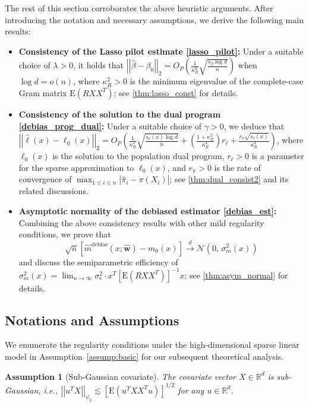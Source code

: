 \documentclass[ejsv2,noshowframe]{imsart}
\theoremstyle{plain}
\newtheorem{assumption}{Assumption}
\theoremstyle{definition}
\theoremstyle{remark}
\newcommand{\norm}[1]{\left|\left| #1 \right|\right|}
\renewcommand{\hat}{\widehat}
\begin{document}
The rest of this section corroborates the above heuristic arguments. After introducing the notation and necessary assumptions, we derive the following main results:
\begin{itemize}
	\item {\bf Consistency of the Lasso pilot estimate \eqref{lasso_pilot}:} Under a suitable choice of $\lambda > 0$, it holds that $\norm{\hat{\beta}-\beta_0}_2= O_P\left(\frac{1}{\kappa_R^2}\sqrt{\frac{s_{\beta}\log d}{n}}\right)$ when $\log d=o(n)$, where $\kappa_R^2 >0$ is the minimum eigenvalue of the complete-case Gram matrix $\mathrm{E}\left(RXX^T\right)$; see \autoref{thm:lasso_const} for details.
	
	\item {\bf Consistency of the solution to the dual program \eqref{debias_prog_dual}:} Under a suitable choice of $\gamma >0$, we deduce that $\norm{\hat{\ell}(x) -\ell_0(x)}_2 = O_P\left(\frac{1}{\kappa_R^3} \sqrt{\frac{s_{\ell}(x)\log d}{n}} + \left(\frac{1+\kappa_R^2}{\kappa_R^4}\right) r_{\ell} + \frac{r_{\pi}\sqrt{s_{\ell}(x)}}{\kappa_R^4} \right)$, where $\ell_0(x)$ is the solution to the population dual program, $r_{\ell}>0$ is a parameter for the sparse approximation to $\ell_0(x)$, and $r_{\pi}>0$ is the rate of convergence of $\max_{1 \leq i \leq n}\left|\hat{\pi}_i-\pi(X_i) \right|$; see \autoref{thm:dual_consist2} and its related discussions.
	
	\item {\bf Asymptotic normality of the debiased estimator \eqref{debias_est}:} Combining the above consistency results with other mild regularity conditions, we prove that 
	$$\sqrt{n}\left[\hat{m}^{\mathrm{debias}}(x;\hat{\bm{w}}) - m_0(x)\right] \stackrel{d}{\to} \mathcal{N}\left(0,\, \sigma_m^2(x) \right)$$ 
	and discuss the semiparametric efficiency of $\sigma_m^2(x) = \lim_{n\to\infty} \sigma_{\epsilon}^2 \cdot x^T\left[\mathrm{E}\left(R XX^T\right)\right]^{-1}x$; see \autoref{thm:asym_normal} for details.
\end{itemize}

\subsection{Notations and Assumptions}
\label{subsec:assump}

We enumerate the regularity conditions under the high-dimensional sparse linear model in Assumption~\ref{assump:basic} for our subsequent theoretical analysis. 

\begin{assumption}[Sub-Gaussian covariate]
	\label{assump:sub_gaussian}
	The covariate vector $X\in \mathbb{R}^d$ is sub-Gaussian, \emph{i.e.}, $\norm{u^TX}_{\psi_2} \lesssim \left[\mathrm{E}\left(u^TXX^T u\right)\right]^{1/2}$ for any $u\in \mathbb{R}^d$.
\end{assumption}
\end{document}
